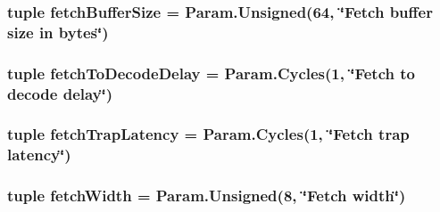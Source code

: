 \label{classO3CPU_1_1DerivO3CPU_ac7d8d81c4bbae7e104c3802f303ad90a}
\hypertarget{classO3CPU_1_1DerivO3CPU_a11c5a1df983c0acae9f735e73bb07acf}{
\subsubsection[{fetchBufferSize}]{\setlength{\rightskip}{0pt plus 5cm}tuple {\bf fetchBufferSize} = Param.Unsigned(64, \char`\"{}Fetch buffer size in bytes\char`\"{})}}
\label{classO3CPU_1_1DerivO3CPU_a11c5a1df983c0acae9f735e73bb07acf}
\hypertarget{classO3CPU_1_1DerivO3CPU_a10e1e587508ee15562df112d1142b851}{
\subsubsection[{fetchToDecodeDelay}]{\setlength{\rightskip}{0pt plus 5cm}tuple {\bf fetchToDecodeDelay} = Param.Cycles(1, \char`\"{}Fetch to decode delay\char`\"{})}}
\label{classO3CPU_1_1DerivO3CPU_a10e1e587508ee15562df112d1142b851}
\hypertarget{classO3CPU_1_1DerivO3CPU_a900fa0c4fce6b3d76add508093ce4fee}{
\subsubsection[{fetchTrapLatency}]{\setlength{\rightskip}{0pt plus 5cm}tuple {\bf fetchTrapLatency} = Param.Cycles(1, \char`\"{}Fetch trap latency\char`\"{})}}
\label{classO3CPU_1_1DerivO3CPU_a900fa0c4fce6b3d76add508093ce4fee}
\hypertarget{classO3CPU_1_1DerivO3CPU_a0a9358767ec7c9dfef70564672b53522}{
\subsubsection[{fetchWidth}]{\setlength{\rightskip}{0pt plus 5cm}tuple {\bf fetchWidth} = Param.Unsigned(8, \char`\"{}Fetch width\char`\"{})}}
